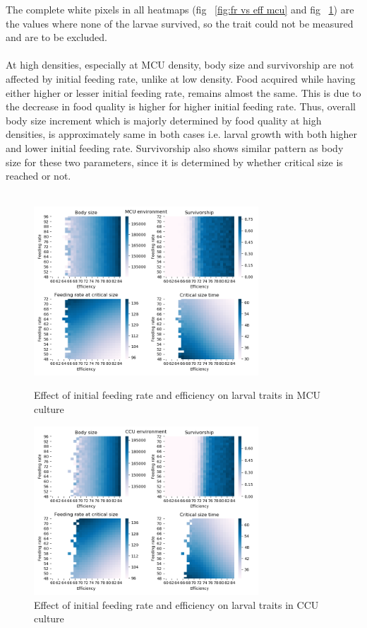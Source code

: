 The complete white pixels in all heatmaps (fig ~\ref{fig:fr vs eff mcu} and fig ~\ref{fig:fr vs eff ccu}) are the values where none of the larvae survived, so the trait could not be measured and are to be excluded.
\\ \\
At high densities, especially at MCU density, body size and survivorship are not affected by initial feeding rate, unlike at low density. Food acquired while having either higher or lesser initial feeding rate, remains almost the same. This is due to the decrease in food quality is higher for higher initial feeding rate. Thus, overall body size increment which is majorly determined by food quality at high densities, is approximately same in both cases i.e. larval growth with both higher and lower initial feeding rate. Survivorship also shows similar pattern as body size for these two parameters, since it is determined by whether critical size is reached or not.\\ \\
\begin{figure}[!tbp]
  \centering
  \includegraphics[width=0.75\textwidth]{C3/Figs/Feeding rate_vs_Efficiency_MCU}
  \caption{Effect of initial feeding rate and efficiency on larval traits in MCU culture}
  \label{fig:fr vs eff mcu}
  \vspace{24pt}
  \includegraphics[width=0.75\textwidth]{C3/Figs/Feeding rate_vs_Efficiency_CCU}
  \caption{Effect of initial feeding rate and efficiency on larval traits in CCU culture}
  \label{fig:fr vs eff ccu}
\end{figure}
\newpage

